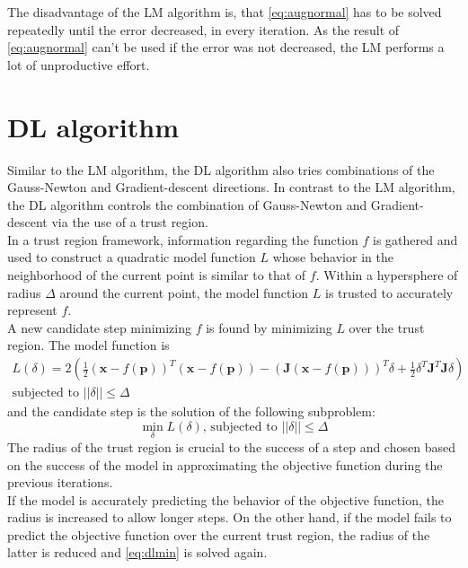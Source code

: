 The disadvantage of the \ac{LM} algorithm is, that \autoref{eq:augnormal} has to be solved repeatedly until the error decreased, in every iteration. As the result of \autoref{eq:augnormal} can't be used if the error was not decreased, the \ac{LM} performs a lot of unproductive effort.

\section{\acf{DL} algorithm}
Similar to the \ac{LM} algorithm, the \ac{DL} algorithm also tries combinations of the Gauss-Newton and Gradient-descent directions. In contrast to the \ac{LM} algorithm, the \ac{DL} algorithm controls the combination of Gauss-Newton and Gradient-descent via the use of a trust region.\\

In a trust region framework, information regarding the function $f$ is gathered and used to construct a quadratic model function $L$ whose behavior in the neighborhood of the current point is similar to that of $f$. Within a hypersphere of radius $\Delta$ around the current point, the model function $L$ is trusted to accurately represent $f$.\\

A new candidate step minimizing $f$ is found by minimizing $L$ over the trust region. The model function is
\begin{align}
  L(\delta) = 2(\frac{1}{2} (\mathbf{x} - f(\mathbf{p}))^T(\mathbf{x} - f(\mathbf{p})) - (\mathbf{J}(\mathbf{x} - f(\mathbf{p})))^T \delta + \frac{1}{2} \delta^T \mathbf{J}^T \mathbf{J} \delta)\\
  \text{subjected to } ||\delta|| \le \Delta \nonumber
\end{align}
and the candidate step is the solution of the following subproblem:
\begin{equation}
  \min_\delta L(\delta) \text{, subjected to } ||\delta|| \le \Delta
  \label{eq:dlmin}
\end{equation}
The radius of the trust region is crucial to the success of a step and chosen based on the success of the model in approximating the objective function during the previous iterations.\\
If the model is accurately predicting the behavior of the objective function, the radius is increased to allow longer steps. On the other hand, if the model fails to predict the objective function over the current trust region, the radius of the latter is reduced and \autoref{eq:dlmin} is solved again.

